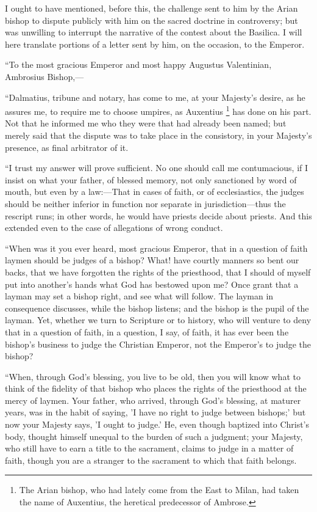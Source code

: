 I ought to have mentioned, before this, the challenge sent to him
by the Arian bishop to dispute publicly with him on the sacred
doctrine in controversy; but was unwilling to interrupt the narrative
of the contest about the Basilica. I will here translate portions of a
letter sent by him, on the occasion, to the Emperor.

``To the most gracious Emperor and most happy Augustus
Valentinian, Ambrosius Bishop,—

``Dalmatius, tribune and notary, has come to me, at your
Majesty's desire, as he assures me, to require me to choose umpires,
as Auxentius \footnote{The Arian
bishop, who had lately come from the East to Milan, had taken the name
of Auxentius, the heretical predecessor of Ambrose.} has done on
his part. Not that he informed me who they were that had already been
named; but merely said that the dispute was to take place in the
consistory, in your Majesty's presence, as final arbitrator of it.

``I trust my answer will prove sufficient. No one should call
me contumacious, if I insist on what your father, of blessed memory,
not only sanctioned by word of mouth, but even by a law:—That in
cases of faith, or of ecclesiastics, the judges should be neither
inferior in function nor separate in jurisdiction—thus the rescript
runs; in other words, he would have priests decide about priests. And
this extended even to the case of allegations of wrong conduct.

``When was it you ever heard, most gracious Emperor, that in a
question of faith laymen should be judges of a bishop? What! have
courtly manners so bent our backs, that we have forgotten the rights
of the priesthood, that I should of myself put into another's hands
what God has bestowed upon me? Once grant that a layman may set a
bishop right, and see what will follow. The layman in consequence
discusses, while the bishop listens; and the bishop is the pupil of
the layman. Yet, whether we turn to Scripture or to history, who will
venture to deny that in a question of faith, in a question, I say, of
faith, it has ever been the bishop's business to judge the Christian
Emperor, not the Emperor's to judge the bishop?

``When, through God's blessing, you live to be old, then you
will know what to think of the fidelity of
that bishop who places the rights of the priesthood at the mercy of
laymen. Your father, who arrived, through God's blessing, at maturer
years, was in the habit of saying, 'I have no right to judge between
bishops;' but now your Majesty says, 'I ought to judge.' He, even
though baptized into Christ's body, thought himself unequal to the
burden of such a judgment; your Majesty, who still have to earn a
title to the sacrament, claims to judge in a matter of faith, though
you are a stranger to the sacrament to which that faith belongs.

